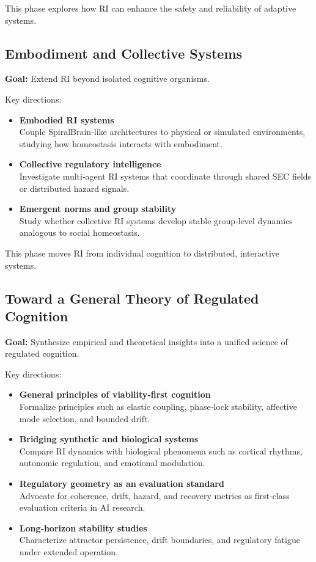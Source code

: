 \documentclass[12pt,a4paper]{report}
\begin{document}
This phase explores how RI can enhance the safety and reliability of adaptive systems.

\subsection{Embodiment and Collective Systems}

\textbf{Goal:} Extend RI beyond isolated cognitive organisms.

Key directions:

\begin{itemize}
\item \textbf{Embodied RI systems} \\
  Couple SpiralBrain‑like architectures to physical or simulated environments, studying how homeostasis interacts with embodiment.

\item \textbf{Collective regulatory intelligence} \\
  Investigate multi‑agent RI systems that coordinate through shared SEC fields or distributed hazard signals.

\item \textbf{Emergent norms and group stability} \\
  Study whether collective RI systems develop stable group‑level dynamics analogous to social homeostasis.
\end{itemize}

This phase moves RI from individual cognition to distributed, interactive systems.

\subsection{Toward a General Theory of Regulated Cognition}

\textbf{Goal:} Synthesize empirical and theoretical insights into a unified science of regulated cognition.

Key directions:

\begin{itemize}
\item \textbf{General principles of viability‑first cognition} \\
  Formalize principles such as elastic coupling, phase‑lock stability, affective mode selection, and bounded drift.

\item \textbf{Bridging synthetic and biological systems} \\
  Compare RI dynamics with biological phenomena such as cortical rhythms, autonomic regulation, and emotional modulation.

\item \textbf{Regulatory geometry as an evaluation standard} \\
  Advocate for coherence, drift, hazard, and recovery metrics as first‑class evaluation criteria in AI research.

\item \textbf{Long‑horizon stability studies} \\
  Characterize attractor persistence, drift boundaries, and regulatory fatigue under extended operation.
\end{itemize}
\end{document}

